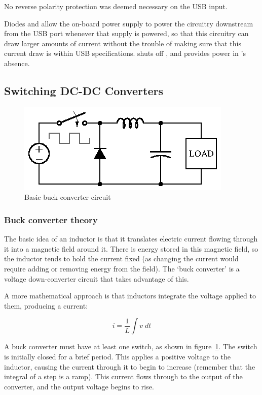 No reverse polarity protection was deemed necessary on the USB input.

Diodes  and  allow the on-board power supply to power
the circuitry downstream from the USB port whenever that supply is powered,
so that this circuitry can draw larger amounts of current without the trouble
of making sure that this current draw is within USB specifications.
 shuts off , and  provides power in
's absence.


\subsection{Switching DC-DC Converters}


\begin{figure}[H]
\centering
\includegraphics[]{buckconv}
\caption{Basic buck converter circuit}
\label{fig:basicbuck}
\end{figure}

\subsubsection{Buck converter theory}

The basic idea of an inductor is that it translates electric current flowing
through it into a magnetic field around it. There is energy stored in this
magnetic field, so the inductor tends to hold the current fixed (as changing
the current would require adding or removing energy from the field). The
`buck converter' is a voltage down-converter circuit that takes advantage
of this.

A more mathematical approach is that inductors integrate the voltage applied
to them, producing a current:

\begin{equation*}
    i = \frac{1}{L} \int v\;dt
\end{equation*}

A buck converter must have at least one switch, as shown in
figure~\ref{fig:basicbuck}.  The switch is initially closed for a brief period.
This applies a positive voltage to the inductor, causing the current through it
to begin to increase (remember that the integral of a step is a ramp). This
current flows through to the output of the converter, and the output voltage
begins to rise.

